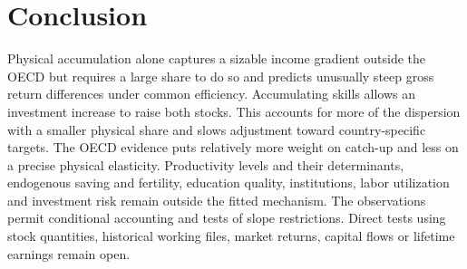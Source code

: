 \documentclass[11pt]{article}
\begin{document}
\section{Conclusion}
Physical accumulation alone captures a sizable income gradient outside the OECD but requires a large share to do so and predicts unusually steep gross return differences under common efficiency. Accumulating skills allows an investment increase to raise both stocks. This accounts for more of the dispersion with a smaller physical share and slows adjustment toward country-specific targets. The OECD evidence puts relatively more weight on catch-up and less on a precise physical elasticity. Productivity levels and their determinants, endogenous saving and fertility, education quality, institutions, labor utilization and investment risk remain outside the fitted mechanism. The observations permit conditional accounting and tests of slope restrictions. Direct tests using stock quantities, historical working files, market returns, capital flows or lifetime earnings remain open.

\appendix
\end{document}
